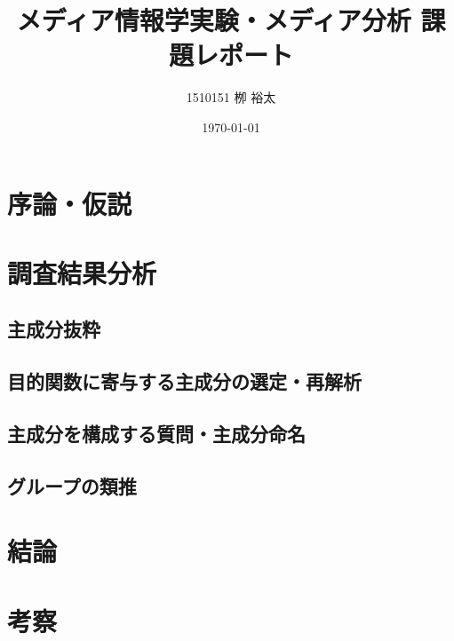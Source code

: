 \documentclass[11pt,a4paper, uplatex]{jsarticle}
\title{メディア情報学実験・メディア分析 課題レポート}
\author{1510151  栁 裕太}
\date{\today}
\begin{document}
\maketitle
\section{序論・仮説}
\section{調査結果分析}
\subsection{主成分抜粋}
\subsection{目的関数に寄与する主成分の選定・再解析}
\subsection{主成分を構成する質問・主成分命名}
\subsection{グループの類推}


\section{結論}
\section{考察}
\end{document}
